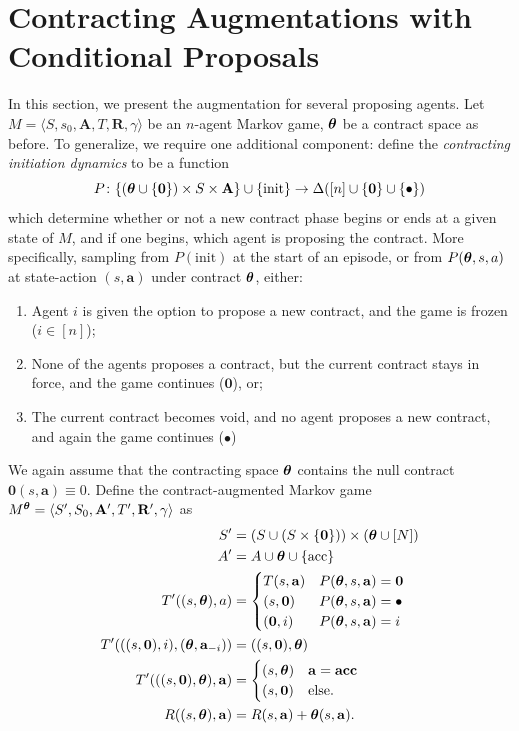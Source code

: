 \section{Contracting Augmentations with Conditional Proposals}\label{apx:formulation}
In this section, we present the augmentation for several proposing agents. Let $M = \langle S, s_0, \mathbf A, T, \mathbf R, \gamma\rangle$ be an $n$-agent Markov game, ${\boldsymbol{\theta}}$ be a contract space as before. To generalize, we require one additional component: define the \emph{contracting initiation dynamics} to be a function
\[
P \colon \{(\boldsymbol{\boldsymbol{\theta}} \cup \{\boldsymbol 0\}) \times S \times \mathbf A\} \cup \{\textrm{init}\} \to \Delta ([n] \cup \{\boldsymbol 0\} \cup \{\bullet\})
\]
which determine whether or not a new contract phase begins or ends at a given state of $M$, and if one begins, which agent is proposing the contract. More specifically, sampling from $P(\textrm{init})$ at the start of an episode, or from $P(\boldsymbol{\boldsymbol{\theta}}, s,a)$ at state-action $(s,\mathbf a)$ under contract $\boldsymbol{\boldsymbol{\theta}}$, either:

\begin{enumerate}
    \item Agent $i$ is given the option to propose a new contract, and the game is frozen ($i \in  [n]$); 
    \item None of the agents proposes a contract, but the current contract stays in force, and the game continues ($\mathbf 0$), or; 
    \item The current contract becomes void, and no agent proposes a new contract, and again the game continues ($\bullet$)
\end{enumerate}

We again assume that the contracting space ${\boldsymbol{\theta}}$ contains the null contract $\mathbf 0 (s,\mathbf a) \equiv 0$. Define the contract-augmented Markov game $M^{{\boldsymbol{\theta}}} = \langle S', S_0, \mathbf A', T', \mathbf R', \gamma\rangle$ as
 \begin{align*}
S' &= (S \cup (S \times \{\mathbf 0\})) \times ({\boldsymbol{\theta}} \cup [N])  \\
A' &= A \cup {\boldsymbol{\theta}} \cup \{\text{acc}\}\\
T'((s, {\boldsymbol{\theta}}),a) &= \begin{cases} T(s,\mathbf a) & P({\boldsymbol{\theta}}, s,\mathbf a) = \boldsymbol 0 \\
(s, \boldsymbol 0) & P(\boldsymbol{\boldsymbol{\theta}}, s, \mathbf a) = \bullet\\
(\boldsymbol 0, i) & P(\boldsymbol{\boldsymbol{\theta}}, s, \mathbf a)= i\end{cases}\\
T'(((s,\boldsymbol 0), i), (\boldsymbol{\boldsymbol{\theta}}, \mathbf a_{-i})) &= ((s,\boldsymbol 0), \boldsymbol{\boldsymbol{\theta}})\\
T'(((s,\boldsymbol 0), \boldsymbol{\boldsymbol{\theta}}), \mathbf a) &= \begin{cases}  (s, {\boldsymbol{\theta}}) & \mathbf a = \textbf{acc}\\ (s,\boldsymbol 0) & \text{else.}\end{cases}\\
R((s, {\boldsymbol{\theta}}), \mathbf a) &= R(s, \mathbf a) + {\boldsymbol{\theta}}(s,
\mathbf a).
\end{align*}

